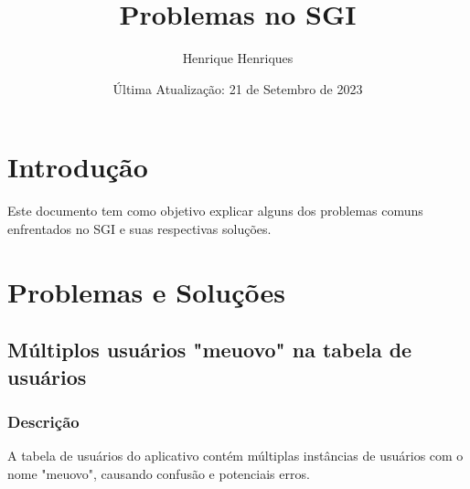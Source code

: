 \documentclass[12pt]{article}
\title{Problemas no SGI}
\author{Henrique Henriques}
\date{Última Atualização: 21 de Setembro de 2023}
\begin{document}
\maketitle

\section{Introdução}
Este documento tem como objetivo explicar alguns dos problemas comuns enfrentados no SGI e suas respectivas soluções.

\section{Problemas e Soluções}
\subsection{Múltiplos usuários "meuovo" na tabela de usuários}
\subsubsection{Descrição}
A tabela de usuários do aplicativo contém múltiplas instâncias de usuários com o nome "meuovo", causando confusão e potenciais erros.
\end{document}
